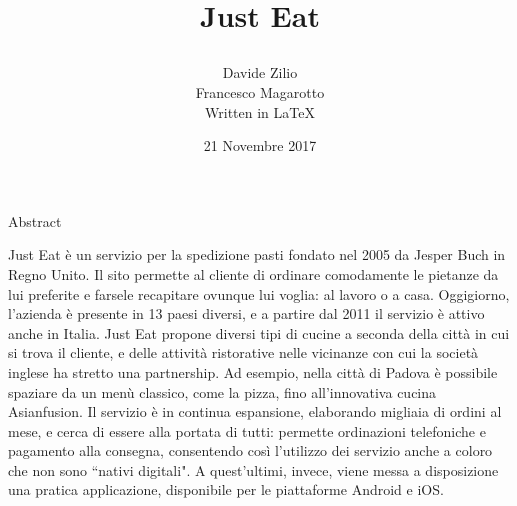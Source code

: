 \documentclass[10pt]{article}
\title{\begin{Huge}Just Eat\end{Huge}}
\author{Davide Zilio\\Francesco Magarotto\\Written in \LaTeX}
\date{21 Novembre 2017}
\begin{document}
	\maketitle
	\begin{large}
		\begin{center}
			\LARGE Abstract
		\end{center}
	\begin{linenumbers}
	Just Eat \`e un servizio per la spedizione pasti fondato nel 2005 da Jesper Buch in Regno Unito. Il sito permette al cliente di ordinare comodamente le pietanze da lui preferite e farsele recapitare ovunque lui voglia: al lavoro o a casa. 
	Oggigiorno, l'azienda \`e presente in 13 paesi diversi, e a partire dal 2011 il servizio \`e  attivo anche in Italia. Just Eat propone diversi tipi di cucine a seconda della citt\`a in cui si trova il cliente, e delle attivit\`a ristorative nelle vicinanze con cui la societ\`a inglese ha stretto una partnership. Ad esempio, nella citt\`a di Padova \`e possibile spaziare da un men\`u classico, come la pizza, fino all'innovativa cucina Asianfusion. Il servizio \`e in continua espansione, elaborando migliaia di ordini al mese, e cerca di essere alla portata di tutti: permette ordinazioni telefoniche e pagamento alla consegna, consentendo cos\`i l'utilizzo dei servizio anche a coloro che non sono ``nativi digitali". A quest'ultimi, invece, viene messa a disposizione una pratica applicazione, disponibile per le piattaforme Android\texttrademark{} e iOS\texttrademark{}.
	\end{linenumbers}
	\end{large}
	\pagebreak
	\tableofcontents{}
	\pagebreak
\end{document}
